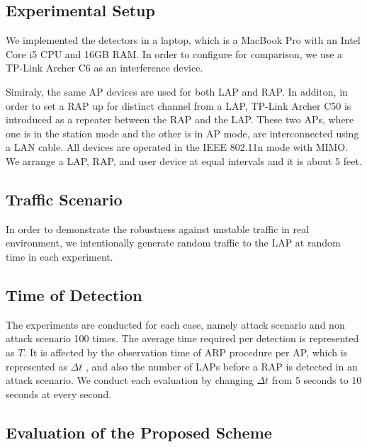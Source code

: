 \documentclass[conference]{IEEEtran}
\begin{document}
\subsection{Experimental Setup}
We implemented the detectors in a laptop, which is a MacBook Pro with an Intel Core i5 CPU and 16GB RAM.
In order to configure \cite{previous} for comparison, we use a TP-Link Archer C6 as an interference device.

Simiraly, the same AP devices are used for both LAP and RAP.
In additon, in order to set a RAP up for distinct channel from a LAP, TP-Link Archer C50 is introduced as a repeater between the RAP and the LAP.
These two APs, where one is in the station mode and the other is in AP mode, are interconnected using a LAN cable.
All devices are operated in the IEEE 802.11n mode with MIMO.
We arrange a LAP, RAP, and user device at equal intervals and it is about 5 feet.

\subsection{Traffic Scenario}
In order to demonstrate the robustness against unstable traffic in real environment, we intentionally generate random traffic to the LAP at random time in each experiment.

\subsection{Time of Detection}
The experiments are conducted for each case, namely attack scenario and non attack scenario 100 times.
The average time required per detection is represented as $T$.
It is affected by the observation time of ARP procedure per AP, which is represented as $\Delta t$ , and also the number of LAPs before a RAP is detected in an attack scenario.
We conduct each evaluation by changing $\Delta t$ from 5 seconds to 10 seconds at every second.

\subsection{Evaluation of the Proposed Scheme}
\end{document}
